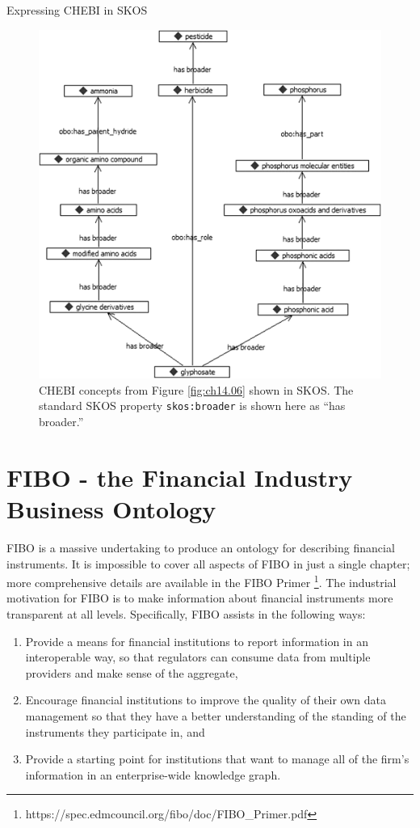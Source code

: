 \begin{challenge}{Expressing CHEBI in SKOS}
\begin{figure}
\centering
\includegraphics[width=5in]{media/ch14/f14-07.png}
\caption{CHEBI concepts from Figure \protect\ref{fig:ch14.06} shown in SKOS. The standard SKOS
property \texttt{skos:broader} is shown here as ``has broader.''
}
\label{fig:ch14.07}
\end{figure}
\end{challenge}

\section{FIBO - the Financial Industry Business Ontology}

FIBO is a massive undertaking to produce an ontology for describing financial instruments.  It is impossible to cover all aspects of FIBO 
in just a single chapter; more comprehensive details are available in the FIBO Primer
\footnote{https://spec.edmcouncil.org/fibo/doc/FIBO\_Primer.pdf}.   The industrial
motivation for FIBO is to make information about financial instruments more transparent at all levels. 
Specifically, 
FIBO assists in the following ways:

\begin{enumerate}
    \item Provide a means for financial institutions to report information in an interoperable way, so that regulators can 
    consume data from multiple providers and make sense of the aggregate, 
    \item Encourage financial institutions to improve the quality of their own data management so that they have 
    a better understanding of the standing of the instruments they participate in, and 
    \item Provide a starting point for institutions that want to manage all of the firm's information in an enterprise-wide knowledge graph. 
\end{enumerate}

